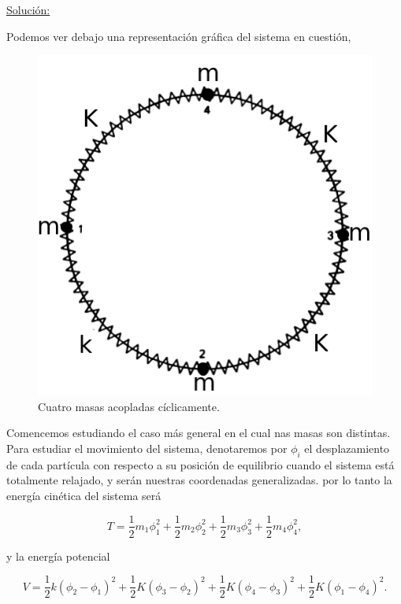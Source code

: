 \documentclass[a4paper,10pt]{article}
\numberwithin{equation}{section}
\begin{document}
\underline{Solución:} \vspace{.3cm}

Podemos ver debajo una representación gráfica del sistema en cuestión,

\begin{figure}[H]
\center 
\includegraphics[scale=0.5]{problema2fig1}
 \caption{Cuatro masas acopladas cíclicamente.}
 \label{fig:problema2fig1}
\end{figure}

Comencemos estudiando el caso más general en el cual nas masas son distintas. 
Para estudiar el movimiento del sistema, denotaremos por $\phi_i$ el desplazamiento de cada 
partícula con respecto a su posición de equilibrio cuando el sistema está totalmente 
relajado, y serán nuestras coordenadas generalizadas.  por lo tanto la energía cinética 
del sistema será

\begin{equation}
 T = \frac{1}{2}m_1\phi_{1}^2 + \frac{1}{2}m_2\phi_{2}^2 + 
 \frac{1}{2}m_3\phi_{3}^2 + \frac{1}{2}m_4\phi_{4}^2,
\end{equation}

y la energía potencial

\begin{equation}
 V = \frac{1}{2}k(\phi_2 - \phi_1)^2 + \frac{1}{2}K(\phi_3 - \phi_2)^2
 + \frac{1}{2}K(\phi_4 - \phi_3)^2 + \frac{1}{2}K(\phi_1 - \phi_4)^2.
 \label{eq:energPotenCirc}
\end{equation}
\end{document}
